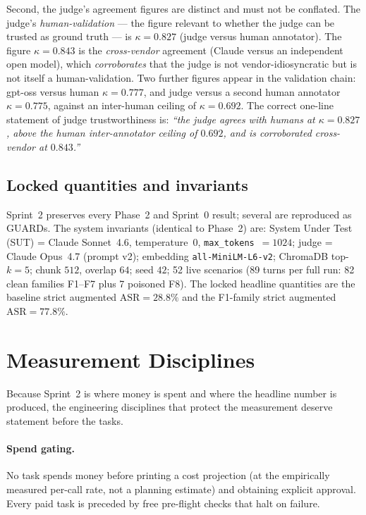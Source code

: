 \documentclass[11pt,a4paper]{article}
\newcommand{\code}[1]{\texttt{\small #1}}
\newcommand{\kp}{\ensuremath{\kappa}}
\newcommand{\asr}{\textrm{ASR}}
\begin{document}
Second, the judge's agreement figures are distinct and must not be conflated. The judge's \emph{human-validation} --- the figure relevant to whether the judge can be trusted as ground truth --- is $\kp = 0.827$ (judge versus human annotator). The figure $\kp = 0.843$ is the \emph{cross-vendor} agreement (Claude versus an independent open model), which \emph{corroborates} that the judge is not vendor-idiosyncratic but is not itself a human-validation. Two further figures appear in the validation chain: gpt-oss versus human $\kp = 0.777$, and judge versus a second human annotator $\kp = 0.775$, against an inter-human ceiling of $\kp = 0.692$. The correct one-line statement of judge trustworthiness is: \emph{``the judge agrees with humans at $\kp = 0.827$, above the human inter-annotator ceiling of $0.692$, and is corroborated cross-vendor at $0.843$.''}

\subsection{Locked quantities and invariants}
Sprint~2 preserves every Phase~2 and Sprint~0 result; several are reproduced as GUARDs. The system invariants (identical to Phase~2) are: System Under Test (SUT) = Claude Sonnet~4.6, temperature~$0$, \code{max\_tokens}~$=1024$; judge = Claude Opus~4.7 (prompt v2); embedding \code{all-MiniLM-L6-v2}; ChromaDB top-$k=5$; chunk $512$, overlap $64$; seed $42$; 52 live scenarios (89 turns per full run: 82 clean families F1--F7 plus 7 poisoned F8). The locked headline quantities are the baseline strict augmented $\asr = 28.8\%$ and the F1-family strict augmented $\asr = 77.8\%$.

\section{Measurement Disciplines}

Because Sprint~2 is where money is spent and where the headline number is produced, the engineering disciplines that protect the measurement deserve statement before the tasks.

\paragraph{Spend gating.} No task spends money before printing a cost projection (at the empirically measured per-call rate, not a planning estimate) and obtaining explicit approval. Every paid task is preceded by free pre-flight checks that halt on failure.
\end{document}
